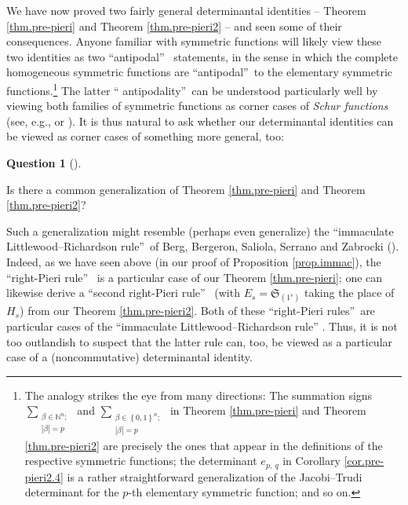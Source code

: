 \documentclass[numbers=enddot,12pt,final,onecolumn,notitlepage,english]{scrartcl}%
\theoremstyle{definition}
\newtheorem{quest}[theo]{Question}
\newenvironment{question}[1][]
{\begin{quest}[#1]\begin{leftbar}}
{\end{leftbar}\end{quest}}
\newenvironment{question}[1][Question]{\noindent\textbf{#1.} }{\ \rule{0.5em}{0.5em}}
\let\sumnonlimits\sum
\renewcommand{\sum}{\sumnonlimits\limits}
\begin{document}
We have now proved two fairly general determinantal identities -- Theorem
\ref{thm.pre-pieri} and Theorem \ref{thm.pre-pieri2} -- and seen some of their
consequences. Anyone familiar with symmetric functions will likely view these
two identities as two \textquotedblleft antipodal\textquotedblright%
\ statements, in the sense in which the complete homogeneous symmetric
functions are \textquotedblleft antipodal\textquotedblright\ to the elementary
symmetric functions.\footnote{The analogy strikes the eye from many
directions: The summation signs $\sum_{\substack{\beta\in\mathbb{N}%
^{n};\\\left\vert \beta\right\vert =p}}$ and $\sum_{\substack{\beta\in\left\{
0,1\right\}  ^{n};\\\left\vert \beta\right\vert =p}}$ in Theorem
\ref{thm.pre-pieri} and Theorem \ref{thm.pre-pieri2} are precisely the ones
that appear in the definitions of the respective symmetric functions; the
determinant $e_{p,\ q}$ in Corollary \ref{cor.pre-pieri2.4} is a rather
straightforward generalization of the Jacobi--Trudi determinant for the $p$-th
elementary symmetric function; and so on.} The latter \textquotedblleft
antipodality\textquotedblright\ can be understood particularly well by viewing
both families of symmetric functions as corner cases of \emph{Schur functions}
(see, e.g., \cite[Chapter 7]{Stanley-EC2} or \cite[\S I.3]{Macdon95}). It is
thus natural to ask whether our determinantal identities can be viewed as
corner cases of something more general, too:

\begin{question}
\label{quest.pre-LR}Is there a common generalization of Theorem
\ref{thm.pre-pieri} and Theorem \ref{thm.pre-pieri2}?
\end{question}

Such a generalization might resemble (perhaps even generalize) the
\textquotedblleft immaculate Littlewood--Richardson rule\textquotedblright\ of
Berg, Bergeron, Saliola, Serrano and Zabrocki (\cite[Theorem 7.3]{BBSSZ15}).
Indeed, as we have seen above (in our proof of Proposition \ref{prop.immac}),
the \textquotedblleft right-Pieri rule\textquotedblright\ \cite[Theorem
3.5]{BBSSZ13} is a particular case of our Theorem \ref{thm.pre-pieri}; one can
likewise derive a \textquotedblleft second right-Pieri rule\textquotedblright%
\ (with $E_{s}=\mathfrak{S}_{\left(  1^{s}\right)  }$ taking the place of
$H_{s}$) from our Theorem \ref{thm.pre-pieri2}. Both of these
\textquotedblleft right-Pieri rules\textquotedblright\ are particular cases of
the \textquotedblleft immaculate Littlewood--Richardson rule\textquotedblright%
. Thus, it is not too outlandish to suspect that the latter rule can, too, be
viewed as a particular case of a (noncommutative) determinantal identity.
\end{document}
